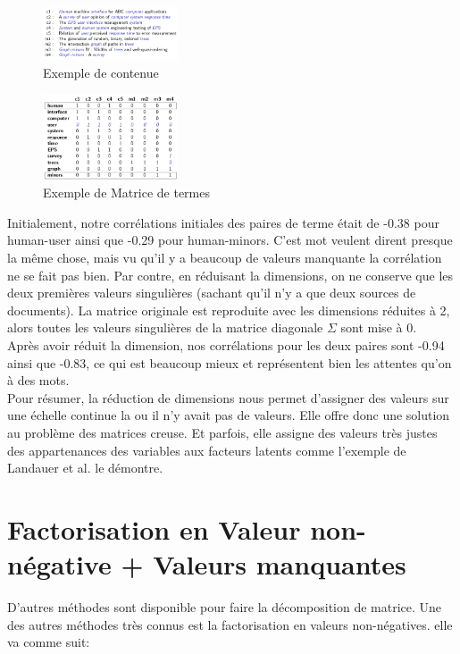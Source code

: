\documentclass[oneside]{book}
\begin{document}
\begin{figure}[!ht]
\centering
\includegraphics[width = 4cm]{exemple_contenu.png}
\caption{Exemple de contenue}
\label{fig:exemple_contenue}
\end{figure}

\begin{figure}[!ht]
\centering
\includegraphics[width = 4cm]{matrice_terme.png}
\caption{Exemple de Matrice de termes}
\label{fig:exemple de matrice termes}
\end{figure}

Initialement, notre corrélations initiales des paires de terme était de -0.38 pour human-user ainsi que -0.29 pour human-minors. C'est mot veulent dirent presque la même chose, mais vu qu'il y a beaucoup de valeurs manquante la corrélation ne se fait pas bien. Par contre, en réduisant la dimensions, on ne conserve que les deux premières valeurs singulières (sachant qu'il n'y a que deux sources de documents). La matrice originale est reproduite avec les dimensions réduites à 2, alors toutes les valeurs singulières de la matrice diagonale $\Sigma$ sont mise à 0. \\

Après avoir réduit la dimension, nos corrélations pour les deux paires sont -0.94 ainsi que -0.83, ce qui est beaucoup mieux et représentent bien les attentes qu'on à des mots.\\

Pour résumer, la réduction de dimensions nous permet d'assigner des valeurs sur une échelle continue la ou il n'y avait pas de valeurs. Elle offre donc une solution au problème des matrices creuse. Et parfois, elle assigne des valeurs très justes des appartenances des variables aux facteurs latents comme l'exemple de Landauer et al. le démontre.

\section{Factorisation en Valeur non-négative + Valeurs manquantes}
D'autres méthodes sont disponible pour faire la décomposition de matrice. Une des autres méthodes très connus est la factorisation en valeurs non-négatives. elle va comme suit:\\
\end{document}
